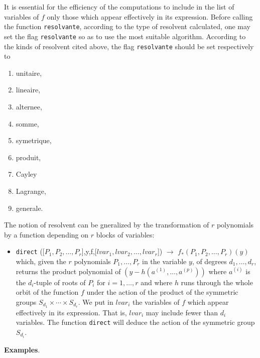 \documentclass[11pt]{article}
\begin{document}
It is essential for the efficiency of the computations to include in the list of
variables of $f$ only those which appear effectively in its expression.  Before
calling the function \texttt{resolvante}, according to the type of resolvent
calculated, one may set the flag \texttt{resolvante} so as to use the most
suitable algorithm.  According to the kinds of resolvent cited above, the flag
\texttt{resolvante} should be set respectively to
\begin{enumerate}
  \item unitaire,
  \item lineaire,
  \item alternee,
  \item somme,
  \item symetrique,
  \item produit,
  \item Cayley
  \item Lagrange,
  \item generale.
\end{enumerate}
The notion of resolvent can be gneralized by the transformation of $r$
polynomials by a function depending on $r$ blocks of variables:
\begin{itemize}
\item \texttt{direct} 
  ([$P_1,P_2,\ldots,P_r$],y,f,[$lvar_1,lvar_2,\ldots ,lvar_r$])
  $\longrightarrow$ $f_*(P_1,P_2, \ldots, P_r)(y)$  \\
  which, given the $r$ polynomials $P_1,\ldots,P_r$ in the variable $y$, of
  degrees $d_1,\ldots ,d_r$, returns the product polynomial of $(y - h(a^{(1)},
  \ldots, a^{(p)}))$ where $a^{(i)}$ is the $d_i$-tuple of roots of $P_i$ for
  $i=1,\dots,r$ and where $h$ runs through the whole orbit of the function $f$
  under the action of the product of the symmetric groups $S_{d_1}\times \cdots
  \times S_{d_r}$.  We put in $lvar_i$ the variables of $f$ which appear
  effectively in its expression.  That is, $lvar_i$ may include fewer than $d_i$
  variables.  The function \texttt{direct} will deduce the action of the
  symmetric group $S_{d_i}$.
\end{itemize}
\textbf{Examples}.
\small
\end{document}
